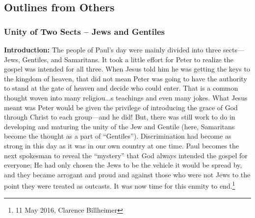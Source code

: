 \subsection{Outlines from Others}

\subsubsection{Unity of Two Sects -- Jews and Gentiles}
\textbf{Introduction:} The people of Paul’s day were mainly divided into three sects—Jews, Gentiles, and Samaritans. It took a little effort for Peter to realize the gospel was intended for all three. When Jesus told him he was getting the keys to the kingdom of heaven, that did not mean Peter was going to have the authority to stand at the gate of heaven and decide who could enter. That is a common thought woven into many religiou...s teachings and even many jokes. What Jesus meant was Peter would be given the privilege of introducing the grace of God through Christ to each group—and he did!
But, there was still work to do in developing and maturing the unity of the Jew and Gentile (here, Samaritans become the thought as a part of “Gentiles”). Discrimination had become as strong in this day as it was in our own country at one time. Paul becomes the next spokesman to reveal the “mystery” that God always intended the gospel for everyone; He had only chosen the Jews to be the vehicle it would be spread by, and they became arrogant and proud and against those who were not Jews to the point they were treated as outcasts. It was now time for this enmity to end.\footnote{11 May 2016, Clarence Billheimer}

